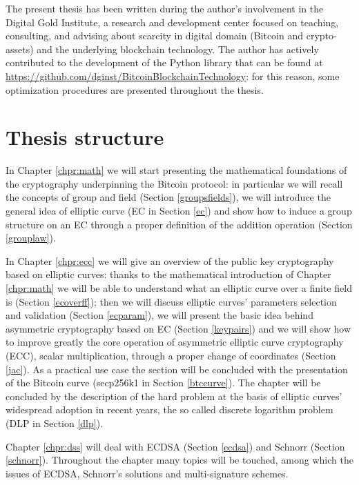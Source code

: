 \bigskip
\noindent
The present thesis has been written during the author's involvement in the Digital Gold Institute, a research and development center focused on teaching, consulting, and advising about scarcity in digital domain (Bitcoin and crypto-assets) and the underlying blockchain technology. The author has actively contributed to the development of the Python library that can be found at \url{https://github.com/dginst/BitcoinBlockchainTechnology}: for this reason, some optimization procedures are presented throughout the thesis.

\bigskip

\bigskip

\section{Thesis structure}
In Chapter \ref{chpr:math} we will start presenting the mathematical foundations of the cryptography underpinning the Bitcoin protocol: in particular we will recall the concepts of group and field (Section \ref{groupsfields}), we will introduce the general idea of elliptic curve (EC in Section \ref{ec}) and show how to induce a group structure on an EC through a proper definition of the addition operation (Section \ref{grouplaw}).

\bigskip
\noindent
In Chapter \ref{chpr:ecc} we will give an overview of the public key cryptography based on elliptic curves: thanks to the mathematical introduction of Chapter \ref{chpr:math} we will be able to understand what an elliptic curve over a finite field is (Section \ref{ecoverff}); then we will discuss elliptic curves' parameters selection and validation (Section \ref{ecparam}), we will present the basic idea behind asymmetric cryptography based on EC (Section \ref{keypairs}) and we will show how to improve greatly the core operation of asymmetric elliptic curve cryptography (ECC), scalar multiplication, through a proper change of coordinates (Section \ref{jac}). As a practical use case the section will be concluded with the presentation of the Bitcoin curve (secp256k1 in Section \ref{btccurve}). The chapter will be concluded by the description of the hard problem at the basis of elliptic curves' widespread adoption in recent years, the so called discrete logarithm problem (DLP in Section \ref{dlp}).

\bigskip
\noindent
Chapter \ref{chpr:dss} will deal with ECDSA (Section \ref{ecdsa}) and Schnorr (Section \ref{schnorr}). Throughout the chapter many topics will be touched, among which the issues of ECDSA, Schnorr's solutions and multi-signature schemes.

